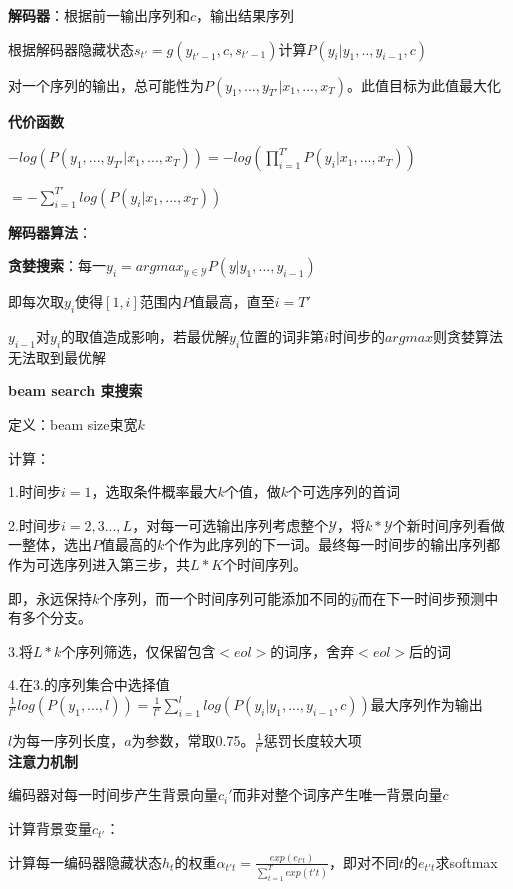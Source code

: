 \documentclass[UTF8]{ctexart}
\begin{document}
  \textbf{解码器}：根据前一输出序列和$c$，输出结果序列

  \quad 根据解码器隐藏状态$s_{t'} = g(y_{t'-1}, c, s_{t'-1})$计算$P(y_i | y_{1}, .., y_{i-1}, c)$
  
  \quad 对一个序列的输出，总可能性为$ P(y_1,...,y_{T'} | x_1, ..., x_T)$。此值目标为此值最大化

  \textbf{代价函数}

  \quad $-log(P(y_1,...,y_{T'} | x_1, ..., x_T)) = -log(\prod_{i=1}^{T'} P(y_i | x_1, ..., x_T))$

  \quad \quad $ = -\sum_{i=1}^{T'}log(P(y_i | x_1, ..., x_T))$
  
  \textbf{解码器算法}：

  \quad \textbf{贪婪搜索}：每一$y_i = argmax_{y\in \mathcal{Y} }P(y|y_1, ..., y_{i-1})$

  \quad \quad 即每次取$y_i$使得$[1, i]$范围内$P$值最高，直至$i = T'$

  \quad \quad $y_{i-1}$对$y_i$的取值造成影响，若最优解$y_i$位置的词非第$i$时间步的$argmax$则贪婪算法无法取到最优解

  \textbf{beam search 束搜索}
  
  \quad 定义：beam size束宽$k$

  \quad 计算：
  
  \quad \quad 1.时间步$i = 1$，选取条件概率最大$k$个值，做$k$个可选序列的首词
  
  \quad \quad 2.时间步$i = 2,3...,L$，对每一可选输出序列考虑整个$\mathcal{Y} $，将$k*\mathcal{Y} $个新时间序列看做一整体，选出$P$值最高的$k$个作为此序列的下一词。最终每一时间步的输出序列都作为可选序列进入第三步，共$L*K$个时间序列。
  
  \quad \quad \quad 即，永远保持$k$个序列，而一个时间序列可能添加不同的$\hat{y}$而在下一时间步预测中有多个分支。
  
  \quad \quad 3.将$L*k$个序列筛选，仅保留包含$<eol>$的词序，舍弃$<eol>$后的词
  
  \quad \quad 4.在3.的序列集合中选择值$\frac{1}{l^a}log(P(y_1, ...,l))=\frac{1}{l^a}\sum_{i=1}^llog(P(y_i|y_1, ..., y_{i-1}, c))$最大序列作为输出
  
  \quad \quad \quad $l$为每一序列长度，$a$为参数，常取0.75。$\frac{1}{l^a}$惩罚长度较大项\\
\textbf{注意力机制}

  编码器对每一时间步产生背景向量$c_i'$而非对整个词序产生唯一背景向量$c$

  计算背景变量$c_{t'}$：

  \quad 计算每一编码器隐藏状态$h_t$的权重$\alpha_{t't} = \frac{exp(e_{t't})}{\sum_{t=1}^{T}exp(t't)}$，即对不同$t$的$e_{t't}$求softmax
\end{document}
